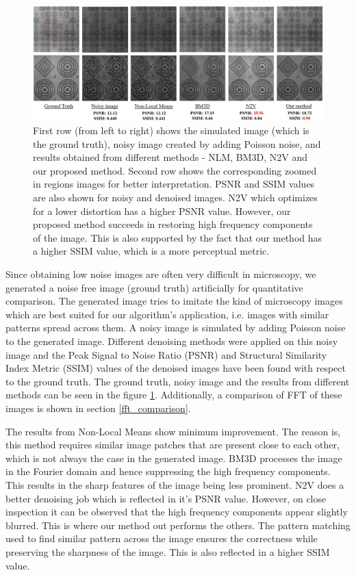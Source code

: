 \documentclass[fleqn,10pt]{wlscirep}
\begin{document}
	\begin{figure}
		\centering
		\includegraphics[scale=0.5]{./imgs/comparison_sample_new_zoomed.jpg}
		\caption{First row (from left to right) shows the simulated image (which is the ground truth), noisy image created by adding Poisson noise, and  results obtained from different methods - NLM, BM3D, N2V and our proposed method. Second row shows the corresponding zoomed in regions images for better interpretation. PSNR and SSIM values are also shown for noisy and denoised images. N2V which optimizes for a lower distortion has a higher PSNR value. However, our proposed method succeeds in restoring high frequency components of the image. This is also supported by the fact that our method has a higher SSIM value, which is a more perceptual metric.}
		\label{fig:comparison_sample}
	\end{figure}


	Since obtaining low noise images are often very difficult in microscopy, we generated a noise free image (ground truth) artificially for quantitative comparison. The generated image tries to imitate the kind of microscopy images which are best suited for our algorithm's application, i.e. images with similar patterns spread across them. A noisy image is simulated by adding Poisson noise to the generated image. Different denoising methods were applied on this noisy image and the Peak Signal to Noise Ratio (PSNR) and Structural Similarity Index Metric (SSIM) values of the denoised images have been found with respect to the ground truth. The ground truth, noisy image and the results from different methods can be seen in the figure \ref{fig:comparison_sample}. Additionally, a comparison of FFT of these images is shown in section \ref{fft_comparison}.
	
	The results from Non-Local Means show minimum improvement. The reason is, this method requires similar image patches that are present close to each other, which is not always the case in the generated image. BM3D processes the image in the Fourier domain and hence suppressing the high frequency components. This results in the sharp features of the image being less prominent. N2V does a better denoising job which is reflected in it's PSNR value. However, on close inspection it can be observed that the high frequency components appear slightly blurred. This is where our method out performs the others. The pattern matching used to find similar pattern across the image ensures the correctness while preserving the sharpness of the image. This is also reflected in a higher SSIM value.
	
\end{document}
